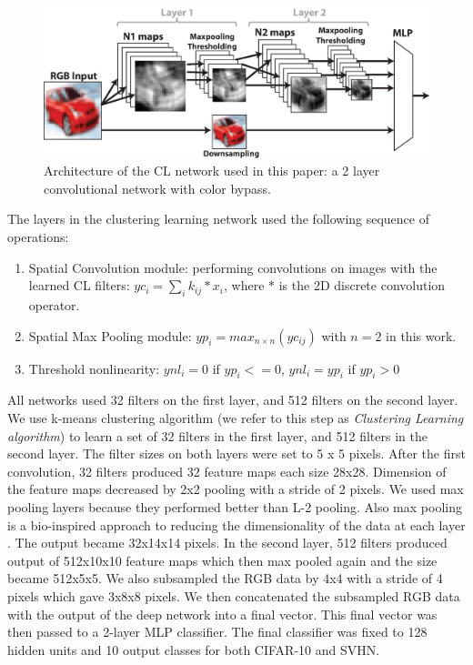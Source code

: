 \documentclass{article} %
\begin{document}
\begin{figure}
\includegraphics[width=5in]{overall-structure.eps}
\caption{Architecture of the CL network used in this paper: a 2 layer convolutional network with color bypass.}
\label{fig-netarch}
\end{figure}


The layers in the clustering learning network used the following sequence of operations:
\begin{enumerate}
\item Spatial Convolution module: performing convolutions on images with the learned CL filters: $yc_i=\sum_i{k_{ij}\ast x_i}$, where $\ast$ is the 2D discrete convolution operator.
\item Spatial Max Pooling module: $yp_i = max_{n \times n}(yc_{ij})$ with $n =  2$ in this work.
\item Threshold nonlinearity: $ynl_i = 0$ if $yp_i <= 0$, $ynl_i = yp_i$ if $yp_i > 0$
\end{enumerate}

All networks used 32 filters on the first layer, and 512 filters on the second layer. We use k-means clustering algorithm (we refer to this step as \textit{Clustering Learning algorithm}) to learn a set of 32 filters in the first layer, and 512 filters in the second layer. The filter sizes on both layers were set to 5 x 5 pixels.  After the first convolution, 32 filters produced 32 feature maps each size 28x28. Dimension of the feature maps decreased by 2x2 pooling with a stride of 2 pixels. We used max pooling layers because they performed better than L-2 pooling. Also max pooling is a bio-inspired approach to reducing the dimensionality of the data at each layer \cite{lampl2004intracellular}. The output became 32x14x14 pixels. In the second layer, 512 filters produced output of 512x10x10 feature maps which then max pooled again and the size became 512x5x5. 
We also subsampled the RGB data by 4x4 with a stride of 4 pixels which gave 3x8x8 pixels.  We then concatenated the subsampled RGB data with the output of the deep network into a final vector. This final vector was then passed to a 2-layer MLP classifier. The final classifier was fixed to 128 hidden units and 10 output classes for both CIFAR-10 and SVHN.
\end{document}
